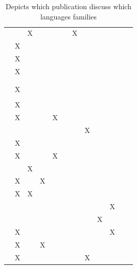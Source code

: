 \documentclass[11pt,a4paper]{book}
\theoremstyle{definition}
\theoremstyle{definition}
\theoremstyle{definition}
\theoremstyle{remark}
\begin{document}
\begin{table}
\begin{tabular}{lp{1cm}p{1cm}p{1cm}p{1cm}p{1cm}p{1cm}p{1.1cm}p{1cm}p{1cm}p{1cm}p{1cm}}
 \cite{beckers2016general} 	& 	& X	& 	& 	& 	& X	& 	& 	& 	& 	\\
 \cite{schaffer2016grounding}  	& X	& 	& 	& 	& 	& 	& 	& 	& 	& 	\\
 \cite{halpern2016appropriate} 	& X	& 	& 	& 	& 	& 	& 	& 	& 	& 	\\
 \cite{blanchard2017cause}  	& X	& 	& 	& 	& 	& 	& 	& 	& 	& 	\\
 \cite{wright2017ness}  	& 	& 	& 	& 	& 	& 	& 	& 	& 	& 	\\
 \cite{icard2017normality} 	& 	& 	& 	& 	& 	& 	& 	& 	& 	& 	\\
 \cite{aleksandrowicz2017computational}  	& X	& 	& 	& 	& 	& 	& 	& 	& 	& 	\\
 \cite{fenton2017proposed}  	& 	& 	& 	& 	& 	& 	& 	& 	& 	& 	\\
 \cite{lagnado2017causation}  	& X	& 	& 	& 	& 	& 	& 	& 	& 	& 	\\
 \cite{bochman2018actual}  	& X	& 	& 	& X	& 	& 	& 	& 	& 	& 	\\
 \cite{ibeling2018conditional}  	& 	& 	& 	& 	& 	& 	& X	& 	& 	& 	\\
 \cite{beckers2018principled} 	& X	& 	& 	& 	& 	& 	& 	& 	& 	& 	\\
 \cite{bochman2018laws}  	& X	& 	& 	& X	& 	& 	& 	& 	& 	& 	\\
 \cite{denecker2018causal}  	& 	& X	& 	& 	& 	& 	& 	& 	& 	& 	\\
 \cite{batusov2018situation}  	& X	& 	& X	& 	& 	& 	& 	& 	& 	& 	\\
 \cite{denecker2019explaining}  	& X	& X	& 	& 	& 	& 	& 	& 	& 	& 	\\
 \cite{liepicna2019evaluation}  	& 	& 	& 	& 	& 	& 	& 	& 	& X	& 	\\
 \cite{leblanc2019explaining} 	& 	& 	& 	& 	& 	& 	& 	& X	& 	& 	\\
 \cite{liepicna2020arguing} 	& X	& 	& 	& 	& 	& 	& 	& 	& X	& 	\\
 \cite{khannecessary}  	& X	& 	& X	& 	& 	& 	& 	& 	& 	& 	\\
 \cite{ibeling2020probabilistic}  	& X	& 	& 	& 	& 	& 	& X	& 	& 	& 	\\
\bottomrule
\end{tabular}
\caption{Depicts which publication discuss which languages families}
\label{tab:language}
\end{table}
\end{document}
